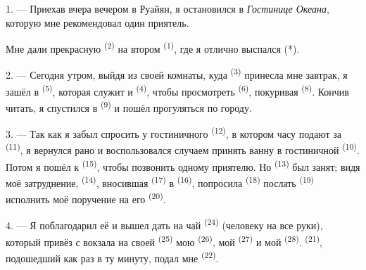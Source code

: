 %


\VUsaut{3.0mm}
\VUsaut{1.6mm}
\VUsaut{2.0mm}
\VUsaut{3.4mm}

1. --- Приехав вчера вечером в Руайян, я остановился в
\textit{Гостинице Океана}, которую мне рекомендовал один приятель.

Мне дали прекрасную  \textsuperscript{(2)} на втором
 \textsuperscript{(1)}, где я отлично выспался (*).

2. --- Сегодня утром, выйдя из своей комнаты, куда 
\textsuperscript{(3)} принесла мне завтрак, я зашёл в 
\textsuperscript{(5)}, которая служит и  \textsuperscript{(4)}, чтобы
просмотреть  \textsuperscript{(6)}, покуривая 
\textsuperscript{(8)}. Кончив читать, я спустился в  \textsuperscript{(9)}
и пошёл прогуляться по городу.

3. --- Так как я забыл спросить у гостиничного 
\textsuperscript{(12)}, в котором часу подают за 
\textsuperscript{(11)}, я вернулся рано и воспользовался случаем принять ванну
в гостиничной  \textsuperscript{(10)}. Потом я пошёл к
 \textsuperscript{(15)}, чтобы позвонить одному приятелю. Но
 \textsuperscript{(13)} был занят; видя моё затруднение,
 \textsuperscript{(14)}, вносившая  \textsuperscript{(17)}
в  \textsuperscript{(16)}, попросила 
\textsuperscript{(18)} послать  \textsuperscript{(19)} исполнить моё
поручение на его  \textsuperscript{(20)}.

4. --- Я поблагодарил её и вышел дать на чай 
\textsuperscript{(24)} (человеку на все руки), который привёз с вокзала на своей
 \textsuperscript{(25)} мою 
\textsuperscript{(26)}, мой  \textsuperscript{(27)} и мой
 \textsuperscript{(28)}.  \textsuperscript{(21)},
подошедший как раз в ту минуту, подал мне  \textsuperscript{(22)}.

